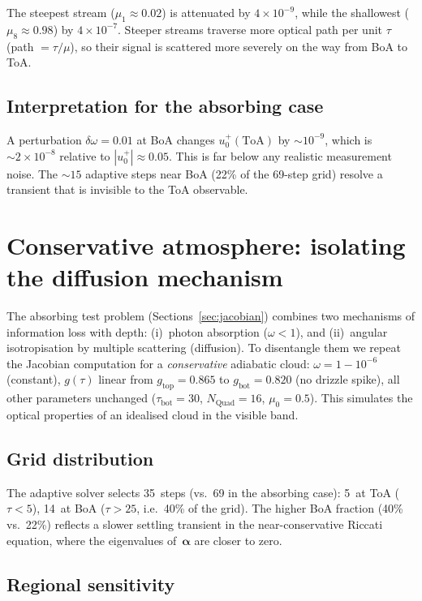\documentclass[11pt]{article}
\newcommand{\balpha}{\boldsymbol{\alpha}}
\begin{document}
The steepest stream ($\mu_1\approx0.02$) is attenuated
by $4\times10^{-9}$, while the shallowest ($\mu_8\approx0.98$)
by $4\times10^{-7}$.  Steeper streams traverse more
optical path per unit $\tau$ (path $= \tau/\mu$), so
their signal is scattered more severely on the way from
BoA to ToA.

\subsection{Interpretation for the absorbing case}

A perturbation $\delta\omega = 0.01$ at BoA changes
$u^+_0(\mathrm{ToA})$ by ${\sim}10^{-9}$, which is
${\sim}2\times10^{-8}$ relative to $|u^+_0| \approx 0.05$.
This is far below any realistic measurement noise.
The ${\sim}15$ adaptive steps near BoA (22\% of the 69-step
grid) resolve a transient that is invisible to the ToA
observable.


\section{Conservative atmosphere: isolating the diffusion mechanism}
\label{sec:conservative}

The absorbing test problem (Sections~\ref{sec:jacobian}) combines
two mechanisms of information loss with depth: (i)~photon
absorption ($\omega < 1$), and (ii)~angular isotropisation
by multiple scattering (diffusion).  To disentangle them we
repeat the Jacobian computation for a \emph{conservative}
adiabatic cloud: $\omega = 1 - 10^{-6}$ (constant),
$g(\tau)$ linear from $g_\mathrm{top}=0.865$ to
$g_\mathrm{bot}=0.820$ (no drizzle spike), all other
parameters unchanged ($\tau_\mathrm{bot}=30$,
$N_\mathrm{Quad}=16$, $\mu_0=0.5$).  This simulates the
optical properties of an idealised cloud in the visible band.

\subsection{Grid distribution}

The adaptive solver selects 35~steps (vs.\ 69 in the absorbing
case): 5~at ToA ($\tau<5$), 14~at BoA ($\tau>25$, i.e.\ 40\%
of the grid).  The higher BoA fraction (40\% vs.\ 22\%) reflects
a slower settling transient in the near-conservative Riccati
equation, where the eigenvalues of~$\balpha$ are closer to zero.

\subsection{Regional sensitivity}
\end{document}

